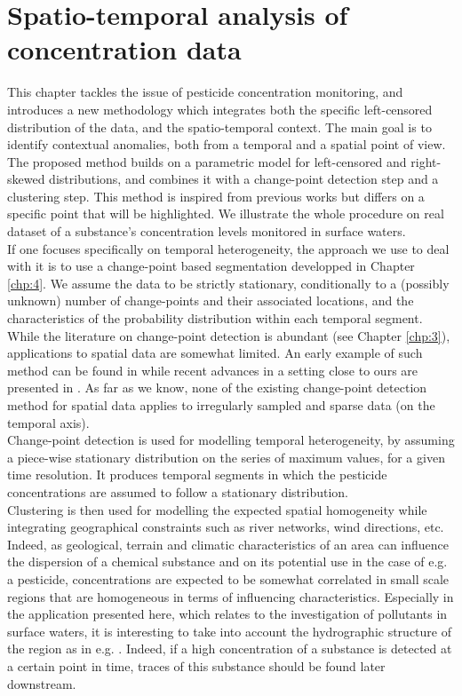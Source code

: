 \chapter{Spatio-temporal analysis of concentration data}\label{chp:5}

\minitoc

\clearpage

This chapter tackles the issue of pesticide concentration monitoring, and introduces a new methodology which integrates both the specific left-censored distribution of the data, and the spatio-temporal context. The main goal is to identify contextual anomalies, both from a temporal and a spatial point of view. The proposed method builds on a parametric model for left-censored and right-skewed distributions, and combines it with a change-point detection step and a clustering step. This method is inspired from previous works \citep{Laroche2022} but differs on a specific point that will be highlighted. We illustrate the whole procedure on real dataset of a substance's concentration levels monitored in surface waters. \\
If one focuses specifically on temporal heterogeneity, the approach we use to deal with it is to use a change-point based segmentation developped in Chapter \ref{chp:4}. We assume the data to be strictly stationary, conditionally to a (possibly unknown) number of change-points and their associated locations, and the characteristics of the probability distribution within each temporal segment.
While the literature on change-point detection is abundant (see Chapter \ref{chp:3}), applications to spatial data are somewhat limited. An early example of such method can be found in \cite{MAJUMDAR2005149} while recent advances in a setting close to ours are presented in \cite{doi:10.1080/07474946.2020.1826796}. As far as we know, none of the existing change-point detection method for spatial data applies to irregularly sampled and sparse data (on the temporal axis). \\
Change-point detection is used for modelling temporal heterogeneity, by assuming a piece-wise stationary distribution on the series of maximum values, for a given time resolution. It produces temporal segments in which the pesticide concentrations are assumed to follow a stationary distribution. \\
Clustering is then used for modelling the expected spatial homogeneity while integrating geographical constraints such as river networks, wind directions, etc. Indeed, as geological, terrain and climatic characteristics of an area can influence the dispersion of a chemical substance and on its potential use in the case of e.g. a pesticide, concentrations are expected to be somewhat correlated in small scale regions that are homogeneous in terms of influencing characteristics. Especially in the application presented here, which relates to the investigation of pollutants in surface waters, it is interesting to take into account the hydrographic structure of the region as in e.g. \cite{doi:10.1080/07474946.2020.1826796}. Indeed, if a high concentration of a substance is detected at a certain point in time, traces of this substance should be found later downstream.
